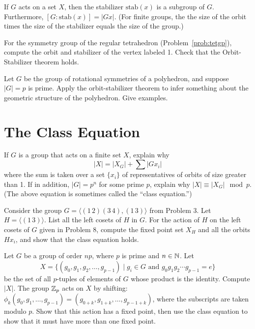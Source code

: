 \begin{theorem}
 If $G$ acts on a set $X$, then the stabilizer $\mbox{stab}(x)$ is a subgroup of $G$. Furthermore, $[G:\mbox{stab}(x)] = \lvert Gx \rvert$. (For finite groups, the the size of the orbit times the size of the stabilizer equals the size of the group.)
\end{theorem}

\begin{problem}
For the symmetry group of the regular tetrahedron (Problem~\ref{prob:tetgp}), compute the orbit and stabilizer of the vertex labeled 1. Check that the Orbit-Stabilizer theorem holds.
\end{problem}



\begin{problem}
Let $G$ be the group of rotational symmetries of a polyhedron, and suppose $\lvert G \rvert = p$ is prime.  Apply the orbit-stabilizer theorem to infer something about the geometric structure of the polyhedron.  Give examples.
\end{problem}

\section{The Class Equation}

\begin{problem}
If $G$ is a group that acts on a finite set $X$, explain why
$$\lvert X \rvert = \lvert X_G \rvert + \sum \lvert G{x_i}\rvert$$
where the sum is taken over a set $\{x_i\}$ of representatives of orbits of size greater than 1.  If in addition, $\lvert G \rvert=p^n$ for some prime $p$, explain why $\lvert X \rvert \equiv \lvert X_G \rvert \mod p$. (The above equation is sometimes called the ``class equation.'')
\end{problem}



\begin{problem}
Consider the group $G=\langle (1\,2)(3\,4), (1\,3) \rangle$ from Problem 3. Let $H = \langle (1\,3) \rangle$. List all the left cosets of $H$ in $G$. For the action of $H$ on the left cosets of $G$ given in Problem 8, compute the fixed point set $X_H$ and all the orbits $Hx_i$, and show that the class equation holds.
\end{problem}



\begin{problem}
Let $G$ be a group of order $np$, where $p$ is prime and $n\in\mathbb{N}$. Let
$$X = \{(g_0,g_1,g_2,\ldots,g_{p-1}) \mid g_i\in G \text{ and } g_0g_1g_2\cdots g_{p-1} = e\}$$
be the set of all $p$-tuples of elements of $G$ whose product is the identity. Compute $|X|$. The group $\mathbb{Z}_p$ acts on $X$ by shifting: $\phi_k(g_0,g_1,\ldots,g_{p-1}) = (g_{0+k}, g_{1+k}, \ldots, g_{p-1+k})$, where the subscripts are taken modulo $p$. Show that this action has a fixed point, then use the class equation to show that it must have more than one fixed point.
\end{problem}




